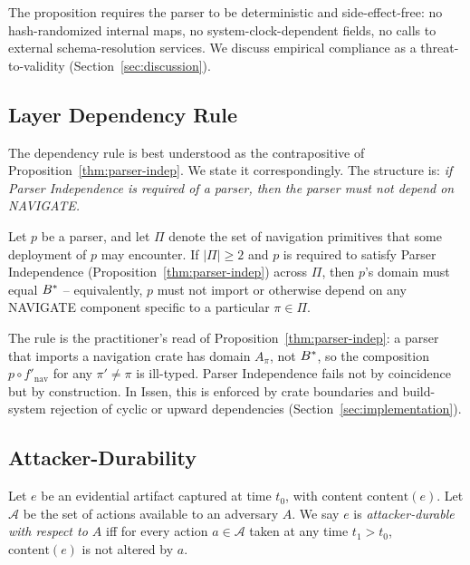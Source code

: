 The proposition requires the parser to be deterministic and side-effect-free:
no hash-randomized internal maps, no system-clock-dependent fields, no calls
to external schema-resolution services. We discuss empirical compliance as a
threat-to-validity (Section~\ref{sec:discussion}).

\subsection{Layer Dependency Rule}

The dependency rule is best understood as the contrapositive of
Proposition~\ref{thm:parser-indep}. We state it correspondingly. The
structure is: \emph{if Parser Independence is required of a parser, then
the parser must not depend on NAVIGATE.}

\begin{proposition}
\label{thm:layer-rule}
Let $p$ be a parser, and let $\Pi$ denote the set of navigation primitives
that some deployment of $p$ may encounter. If $|\Pi| \geq 2$ and $p$ is
required to satisfy Parser Independence (Proposition~\ref{thm:parser-indep})
across $\Pi$, then $p$'s domain must equal $B^{*}$ -- equivalently, $p$
must not import or otherwise depend on any NAVIGATE component specific to a
particular $\pi \in \Pi$.
\end{proposition}

The rule is the practitioner's read of Proposition~\ref{thm:parser-indep}:
a parser that imports a navigation crate has domain $A_\pi$, not $B^{*}$,
so the composition $p \circ f'_{\mathrm{nav}}$ for any $\pi' \neq \pi$ is
ill-typed. Parser Independence fails not by coincidence but by construction.
In Issen, this is enforced by crate boundaries and build-system rejection
of cyclic or upward dependencies (Section~\ref{sec:implementation}).

\subsection{Attacker-Durability}

\begin{definition}
\label{def:durable}
Let $e$ be an evidential artifact captured at time $t_0$, with content
$\mathrm{content}(e)$. Let $\mathcal{A}$ be the set of actions available
to an adversary $A$. We say $e$ is \emph{attacker-durable with respect to
$A$} iff for every action $a \in \mathcal{A}$ taken at any time $t_1 > t_0$,
$\mathrm{content}(e)$ is not altered by $a$.
\end{definition}

